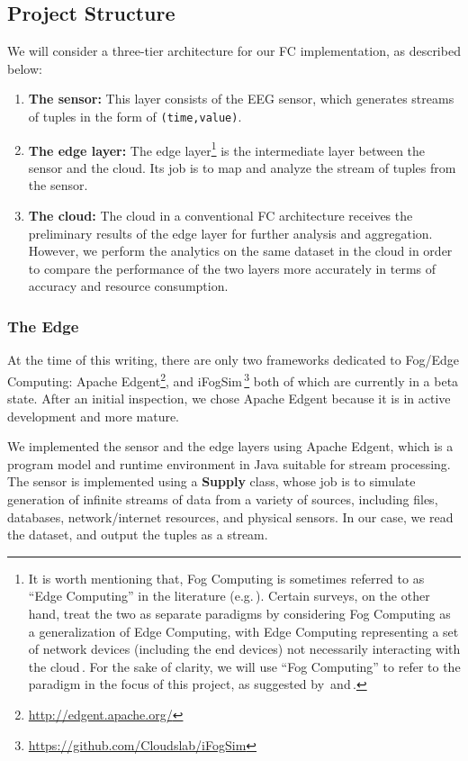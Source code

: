 \documentclass[letterpaper]{article}
\begin{document}
 \subsection{Project Structure}
 We will consider a three-tier architecture for our FC implementation, as described below:

 \begin{enumerate}
     \item \textbf{The sensor:} This layer consists of the EEG sensor, which generates streams of tuples in the form of \texttt{(time,value)}.       

     \item \textbf{The edge layer:} The edge layer\footnote{It is worth mentioning that, Fog Computing is sometimes referred to as ``Edge Computing'' in the literature (e.g.\,\cite{Shi2016,GarciaLopez2015}). Certain surveys, on the other hand, treat the two as separate paradigms by considering Fog Computing as a generalization of Edge Computing, with Edge Computing representing a set of network devices (including the end devices) not necessarily interacting with the cloud\,\cite{Mahmud2018}. For the sake of clarity, we will use ``Fog Computing'' to refer to the paradigm in the focus of this project, as suggested by\,\cite{cisco2012} and\,\cite{Mahmud2018}.} is the intermediate layer between the sensor and the cloud. Its job is to map and analyze the stream of tuples from the sensor.          

     \item \textbf{The cloud:} The cloud in a conventional FC architecture receives the preliminary results of the edge layer for further analysis and aggregation. However, we perform the analytics on the same dataset in the cloud in order to compare the performance of the two layers more accurately in terms of accuracy and resource consumption.
 \end{enumerate}

 \subsubsection{The Edge}
 At the time of this writing, there are only two frameworks dedicated to Fog/Edge Computing: Apache Edgent\footnote{\url{http://edgent.apache.org/}}, and iFogSim\,\cite{iFogSim}\footnote{\url{https://github.com/Cloudslab/iFogSim}} both of which are currently in a beta state. After an initial inspection, we chose Apache Edgent because it is in active development and more mature.
 
 We implemented the sensor and the edge layers using Apache Edgent, which is a program model and runtime environment in Java suitable for stream processing. The sensor is implemented using a \textbf{Supply} class, whose job is to simulate generation of infinite streams of data from a variety of sources, including files, databases, network/internet resources, and physical sensors. In our case, we read the dataset, and output the tuples as a stream.
\end{document}
